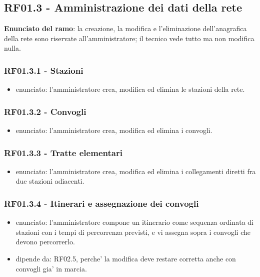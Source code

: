 \documentclass[11pt]{article}
\begin{document}
\subsection{RF01.3 - Amministrazione dei dati della rete}
\label{sec:orgce65aa3}

\textbf{Enunciato del ramo}: la creazione, la modifica e l'eliminazione dell'anagrafica della rete sono
riservate all'amministratore; il tecnico vede tutto ma non modifica nulla.
\subsubsection{RF01.3.1 - Stazioni}
\label{sec:org98de752}
\begin{itemize}
\item enunciato: l'amministratore crea, modifica ed elimina le stazioni della rete.
\end{itemize}
\subsubsection{RF01.3.2 - Convogli}
\label{sec:orgad761ce}
\begin{itemize}
\item enunciato: l'amministratore crea, modifica ed elimina i convogli.
\end{itemize}
\subsubsection{RF01.3.3 - Tratte elementari}
\label{sec:org2a2c536}
\begin{itemize}
\item enunciato: l'amministratore crea, modifica ed elimina i collegamenti diretti fra due stazioni
adiacenti.
\end{itemize}
\subsubsection{RF01.3.4 - Itinerari e assegnazione dei convogli}
\label{sec:org2086c62}
\begin{itemize}
\item enunciato: l'amministratore compone un itinerario come sequenza ordinata di stazioni con i tempi di
percorrenza previsti, e vi assegna sopra i convogli che devono percorrerlo.
\item dipende da: RF02.5, perche' la modifica deve restare corretta anche con convogli gia' in marcia.
\end{itemize}
\end{document}
